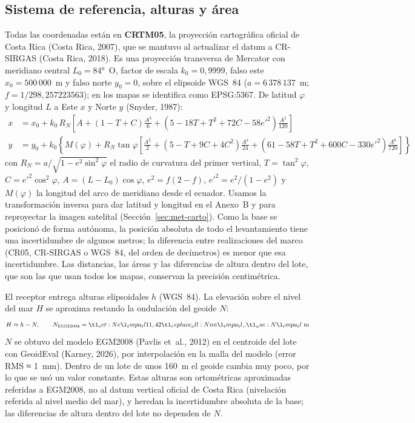 \documentclass[10pt]{article}
\begin{document}
\subsection{Sistema de referencia, alturas y área}\label{sec:met-ref}
Todas las coordenadas están en \textbf{CRTM05}, la proyección cartográfica oficial de Costa Rica (Costa Rica, 2007), que se
mantuvo al actualizar el datum a CR-SIRGAS (Costa Rica, 2018). Es una proyección transversa de Mercator con
meridiano central \(L_0 = 84\text{°}\)~O, factor de escala \(k_0 = 0{,}9999\), falso este \mbox{\(x_0 = 500\,000\)~m} y falso
norte \(y_0 = 0\), sobre el elipsoide WGS~84 (\(a = 6\,378\,137\)~m; \(f = 1/298{,}257223563\)); en los mapas se
identifica como EPSG:5367. De latitud \(\varphi\) y longitud \(L\) a Este \(x\) y Norte \(y\) (Snyder, 1987):
\begin{align}
  x &= x_0 + k_0\,R_N\left[A + (1-T+C)\frac{A^3}{6} + (5-18T+T^2+72C-58e'^2)\frac{A^5}{120}\right] \label{eq:tmx}\\
  y &= y_0 + k_0\left\{M(\varphi) + R_N\tan\varphi\left[\frac{A^2}{2} + (5-T+9C+4C^2)\frac{A^4}{24}
       + (61-58T+T^2+600C-330e'^2)\frac{A^6}{720}\right]\right\} \label{eq:tmy}
\end{align}
con \(R_N = a/\sqrt{1-e^2\sin^2\varphi}\) el radio de curvatura del primer vertical, \(T = \tan^2\varphi\), \(C = e'^2\cos^2\varphi\),
\(A = (L-L_0)\cos\varphi\), \(e^2 = f(2-f)\), \(e'^2 = e^2/(1-e^2)\) y \(M(\varphi)\) la longitud del arco de meridiano
desde el ecuador. Usamos la transformación inversa para dar latitud y longitud en el Anexo~B y para reproyectar la
imagen satelital (Sección~\ref{sec:met-carto}). Como la base se posicionó de forma autónoma, la posición absoluta de
todo el levantamiento tiene una incertidumbre de algunos metros; la diferencia entre realizaciones del marco
(CR05, CR-SIRGAS o WGS~84, del orden de decímetros) es menor que esa incertidumbre. Las distancias, las áreas y las
diferencias de altura dentro del lote, que son las que usan todos los mapas, conservan la precisión centimétrica.

El receptor entrega alturas elipsoidales \(h\) (WGS~84). La elevación sobre el nivel del mar \(H\) se aproxima restando
la ondulación del geoide \(N\):
\begin{equation}
  H \approx h - N, \qquad N_{\text{EGM2008}} = \mnum{\Geoide}~\text{m}
  \label{eq:geoide}
\end{equation}
\(N\) se obtuvo del modelo EGM2008 (Pavlis et~al., 2012) en el centroide del lote con GeoidEval (Karney, 2026), por
interpolación en la malla del modelo (error RMS ≈ 1~mm). Dentro de un lote de unos 160~m el geoide cambia muy poco, por lo
que se usó un valor constante. Estas alturas son ortométricas aproximadas referidas a EGM2008, no al datum vertical
oficial de Costa Rica (nivelación referida al nivel medio del mar), y heredan la incertidumbre absoluta de la base; las
diferencias de altura dentro del lote no dependen de \(N\).
\end{document}
